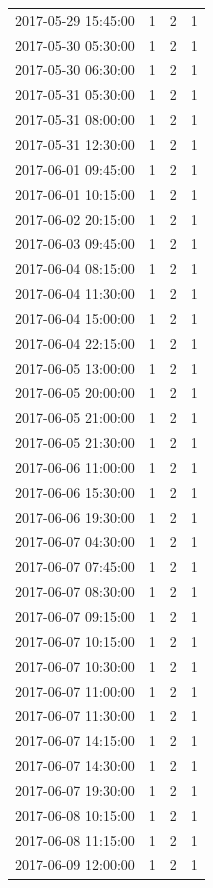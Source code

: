 \begin{tabular}{lrrr}
2017-05-29 15:45:00 & 1 & 2 & 1 \\
2017-05-30 05:30:00 & 1 & 2 & 1 \\
2017-05-30 06:30:00 & 1 & 2 & 1 \\
2017-05-31 05:30:00 & 1 & 2 & 1 \\
2017-05-31 08:00:00 & 1 & 2 & 1 \\
2017-05-31 12:30:00 & 1 & 2 & 1 \\
2017-06-01 09:45:00 & 1 & 2 & 1 \\
2017-06-01 10:15:00 & 1 & 2 & 1 \\
2017-06-02 20:15:00 & 1 & 2 & 1 \\
2017-06-03 09:45:00 & 1 & 2 & 1 \\
2017-06-04 08:15:00 & 1 & 2 & 1 \\
2017-06-04 11:30:00 & 1 & 2 & 1 \\
2017-06-04 15:00:00 & 1 & 2 & 1 \\
2017-06-04 22:15:00 & 1 & 2 & 1 \\
2017-06-05 13:00:00 & 1 & 2 & 1 \\
2017-06-05 20:00:00 & 1 & 2 & 1 \\
2017-06-05 21:00:00 & 1 & 2 & 1 \\
2017-06-05 21:30:00 & 1 & 2 & 1 \\
2017-06-06 11:00:00 & 1 & 2 & 1 \\
2017-06-06 15:30:00 & 1 & 2 & 1 \\
2017-06-06 19:30:00 & 1 & 2 & 1 \\
2017-06-07 04:30:00 & 1 & 2 & 1 \\
2017-06-07 07:45:00 & 1 & 2 & 1 \\
2017-06-07 08:30:00 & 1 & 2 & 1 \\
2017-06-07 09:15:00 & 1 & 2 & 1 \\
2017-06-07 10:15:00 & 1 & 2 & 1 \\
2017-06-07 10:30:00 & 1 & 2 & 1 \\
2017-06-07 11:00:00 & 1 & 2 & 1 \\
2017-06-07 11:30:00 & 1 & 2 & 1 \\
2017-06-07 14:15:00 & 1 & 2 & 1 \\
2017-06-07 14:30:00 & 1 & 2 & 1 \\
2017-06-07 19:30:00 & 1 & 2 & 1 \\
2017-06-08 10:15:00 & 1 & 2 & 1 \\
2017-06-08 11:15:00 & 1 & 2 & 1 \\
2017-06-09 12:00:00 & 1 & 2 & 1 \\

\end{tabular}
